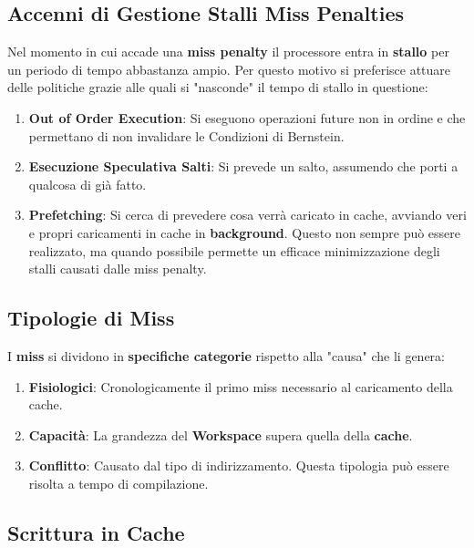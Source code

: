 \documentclass{article}
\begin{document}
\vspace*{15px}

\subsection{Accenni di Gestione Stalli Miss Penalties}

Nel momento in cui accade una \textbf{miss penalty} il processore entra in \textbf{stallo} per un periodo di tempo abbastanza ampio. Per questo motivo si preferisce attuare delle politiche grazie alle quali si "nasconde" il tempo di stallo in questione:

\begin{enumerate}
    \item \textbf{Out of Order Execution}: Si eseguono operazioni future non in ordine e che permettano di non invalidare le Condizioni di Bernstein.
    \item \textbf{Esecuzione Speculativa Salti}: Si prevede un salto, assumendo che porti a qualcosa di già fatto.
    \item \textbf{Prefetching}: Si cerca di prevedere cosa verrà caricato in cache, avviando veri e propri caricamenti in cache in \textbf{background}. Questo non sempre può essere realizzato, ma quando possibile permette un efficace minimizzazione degli stalli causati dalle miss penalty.
\end{enumerate}

\newpage

\subsection{Tipologie di Miss}

I \textbf{miss} si dividono in \textbf{specifiche categorie} rispetto alla "causa" che li genera:

\begin{enumerate}
    \item \textbf{Fisiologici}: Cronologicamente il primo miss necessario al caricamento della cache.
    \item \textbf{Capacità}: La grandezza del \textbf{Workspace} supera quella della \textbf{cache}.
    \item \textbf{Conflitto}: Causato dal tipo di indirizzamento. Questa tipologia può essere risolta a tempo di compilazione.
\end{enumerate}

\subsection{Scrittura in Cache}
\end{document}
